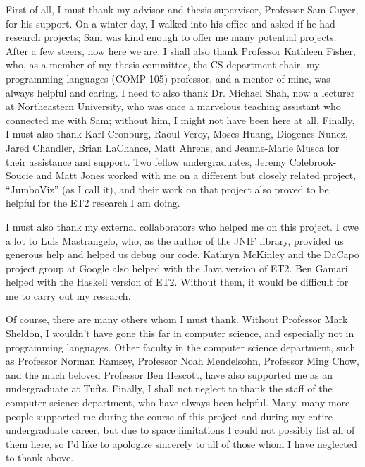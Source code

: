 First of all, I must thank my advisor and thesis supervisor, Professor Sam Guyer, for his support. On a winter day,
I walked into his office and asked if he had research projects; Sam was kind enough to offer me many
potential projects. After a few steers, now here we are.  I shall also thank Professor Kathleen Fisher,
who, as a member of my thesis committee, the CS department chair, my programming languages (COMP 105) professor,
and a mentor of mine, was always helpful and caring. I need to also thank Dr. Michael Shah, now
a lecturer at Northeastern University, who was once a marvelous teaching assistant who connected me with Sam;
without him, I might not have been here at all. Finally, I must also thank Karl Cronburg, Raoul Veroy, Moses Huang,
Diogenes Nunez, Jared Chandler, Brian LaChance, Matt Ahrens, and Jeanne-Marie Musca for their assistance and support.
Two fellow undergraduates, Jeremy Colebrook-Soucie and Matt Jones worked with me on a different but closely related
project, ``JumboViz'' (as I call it), and their work on that project also proved to be helpful for the ET2 research
I am doing.

I must also thank my external collaborators who helped me on this project. I owe a lot to Luis Mastrangelo, who, as the author of the
JNIF library, provided us generous help and helped us debug our code. Kathryn McKinley and the DaCapo project group at Google also helped
with the Java version of ET2. Ben Gamari helped with the Haskell version of ET2. Without them, it would be difficult for me
to carry out my research.

Of course, there are many others whom I must thank. Without Professor Mark Sheldon, I wouldn't
have gone this far in computer science, and especially not in programming languages. Other faculty
in the computer science department, such as Professor Norman Ramsey, Professor Noah Mendelsohn, Professor Ming Chow, and the
much beloved Professor Ben Hescott, have also supported me as an undergraduate at Tufts. Finally, I shall not neglect to
thank the staff of the computer science department, who have always been helpful. Many, many more people supported me
during the course of this project and during my entire undergraduate career, but due to space limitations I could not possibly
list all of them here, so I'd like to apologize sincerely to all of those whom I have neglected to thank above. 
